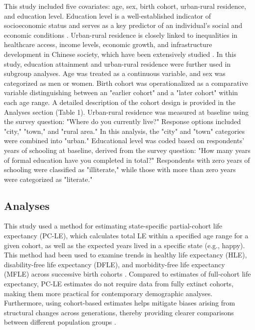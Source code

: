 \documentclass[12pt, a4paper]{article}
\begin{document}
This study included five covariates: age, sex, birth cohort, urban-rural residence, and education level. Education level is a well-established indicator of socioeconomic status and serves as a key predictor of an individual's social and economic conditions \autocite{kwok.2001.use}. Urban-rural residence is closely linked to inequalities in healthcare access, income levels, economic growth, and infrastructure development in Chinese society, which have been extensively studied \autocite{liu.2019.are}. In this study, education attainment and urban-rural residence were further used in subgroup analyses. Age was treated as a continuous variable, and sex was categorized as men or women. Birth cohort was operationalized as a comparative variable distinguishing between an "earlier cohort" and a "later cohort" within each age range. A detailed description of the cohort design is provided in the Analyses section (Table 1). Urban-rural residence was measured at baseline using the survey question: "Where do you currently live?" Response options included "city," "town," and "rural area." In this analysis, the "city" and "town" categories were combined into "urban." Educational level was coded based on respondents' years of schooling at baseline, derived from the survey question: "How many years of formal education have you completed in total?" Respondents with zero years of schooling were classified as "illiterate," while those with more than zero years were categorized as "literate."

\subsection{Analyses}
This study used a method for estimating state-specific partial-cohort life expectancy (PC-LE), which calculates total LE within a specified age range for a given cohort, as well as the expected years lived in a specific state (e.g., happy). This method had been used to examine trends in healthy life expectancy (HLE), disability-free life expectancy (DFLE), and morbidity-free life expectancy (MFLE) across successive birth cohorts \autocite{liu.2019.are,payne.2022.expansion,payne.2019.expansion,shen.2023.disability}. Compared to estimates of full-cohort life expectancy, PC-LE estimates do not require data from fully extinct cohorts, making them more practical for contemporary demographic analyses. Furthermore, using cohort-based estimates helps mitigate biases arising from structural changes across generations, thereby providing clearer comparisons between different population groups \autocite{payne.2022.expansion}.
\end{document}
